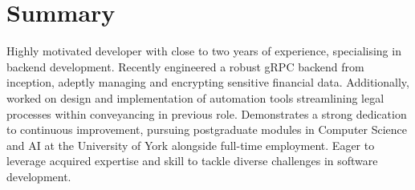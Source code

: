 \documentclass{article}
\begin{document}
\section{Summary}
Highly motivated developer with close to two years of experience, specialising in backend development. Recently engineered a robust gRPC backend from inception, adeptly managing and encrypting sensitive financial data. Additionally, worked on design and implementation of automation tools streamlining legal processes within conveyancing in previous role. Demonstrates a strong dedication to continuous improvement, pursuing postgraduate modules in Computer Science and AI at the University of York alongside full-time employment. Eager to leverage acquired expertise and skill to tackle diverse challenges in software development.
\end{document}
